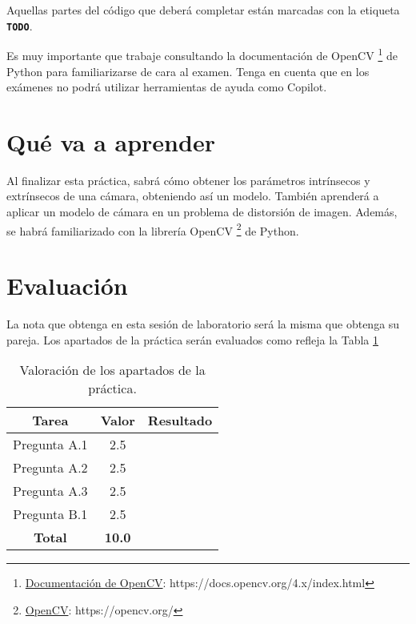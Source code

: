 Aquellas partes del código que deberá completar están marcadas con la etiqueta \textbf{\texttt{TODO}}.

Es muy importante que trabaje consultando la documentación de OpenCV \footnote{\href{https://docs.opencv.org/4.x/index.html}{Documentación de OpenCV}: https://docs.opencv.org/4.x/index.html} de Python para familiarizarse de cara al examen. Tenga en cuenta que en los exámenes no podrá utilizar herramientas de ayuda como Copilot.

\section{Qué va a aprender}

Al finalizar esta práctica, sabrá cómo obtener los parámetros intrínsecos y extrínsecos de una cámara, obteniendo así un modelo. También aprenderá a aplicar un modelo de cámara en un problema de distorsión de imagen. Además, se habrá familiarizado con la librería OpenCV \footnote{\href{https://opencv.org/}{OpenCV}: https://opencv.org/} de Python.

\section{Evaluación}
La nota que obtenga en esta sesión de laboratorio será la misma que obtenga su pareja. Los apartados de la práctica serán evaluados como refleja la Tabla \ref{table:evaluacion}


\begin{table}[h!]
    \centering
    \begin{tabular}{|c|c|c|}
    \hline
    \textbf{Tarea} & \textbf{Valor} & \textbf{Resultado} \\ \hline
    Pregunta A.1 & 2.5 & \\ \hline
    Pregunta A.2 & 2.5 & \\ \hline
    Pregunta A.3 & 2.5 & \\ \hline
    Pregunta B.1 & 2.5 & \\ \hline
    \textbf{Total} & \textbf{10.0} & \\ \hline
    \end{tabular}
    \caption{Valoración de los apartados de la práctica.}
    \label{table:evaluacion}
\end{table}